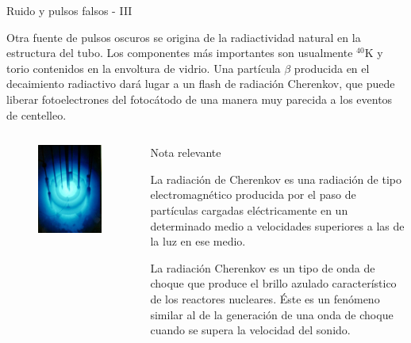 \documentclass[a4paper,10pt]{beamer}
\begin{document}
\begin{frame}{Ruido y pulsos falsos - III}
 
 \begin{justify}
 Otra fuente de pulsos oscuros se origina de la radiactividad natural en la estructura 
 del tubo. Los componentes más importantes son usualmente $^{40}$K y torio contenidos 
 en la envoltura de vidrio. Una partícula $\beta$ producida en el decaimiento radiactivo
 dará lugar a un flash de radiación Cherenkov, que puede liberar fotoelectrones del 
 fotocátodo de una manera muy parecida a los eventos de centelleo.
 \end{justify}
 
 \begin{columns}[c]
  

  \column{2in}
   \begin{figure}
    \center 
    \includegraphics[scale=0.3]{fig28}
   \end{figure}

  \column{2.5in}
  \begin{block}{Nota relevante}
  \begin{justify}
  La radiación de Cherenkov es una radiación de tipo electromagnético producida
  por el paso de partículas cargadas eléctricamente en un determinado medio a 
  velocidades superiores a las de la luz en ese medio. 
  
  \vspace{.3cm}
  
  La radiación Cherenkov es un tipo de onda de choque que
  produce el brillo azulado característico de los reactores nucleares. 
  Éste es un fenómeno similar al de la generación de una onda de choque 
  cuando se supera la velocidad del sonido.
  \end{justify}
  \end{block}
  
 \end{columns}

 
\end{frame}
\end{document}
